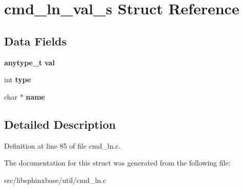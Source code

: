 \section{cmd\+\_\+ln\+\_\+val\+\_\+s Struct Reference}
\label{structcmd__ln__val__s}
\subsection*{Data Fields}
\begin{DoxyCompactItemize}
\item 
\mbox{\label{structcmd__ln__val__s_a6eec646e3d179bd16df60f5a74281835}} 
\textbf{ anytype\+\_\+t} {\bfseries val}
\item 
\mbox{\label{structcmd__ln__val__s_a87bda73148555d31c70d7283d360aadf}} 
int {\bfseries type}
\item 
\mbox{\label{structcmd__ln__val__s_ad0fd5c6eb452608ac187c253f5790ceb}} 
char $\ast$ {\bfseries name}
\end{DoxyCompactItemize}


\subsection{Detailed Description}


Definition at line 85 of file cmd\+\_\+ln.\+c.



The documentation for this struct was generated from the following file\+:\begin{DoxyCompactItemize}
\item 
src/libsphinxbase/util/cmd\+\_\+ln.\+c\end{DoxyCompactItemize}
